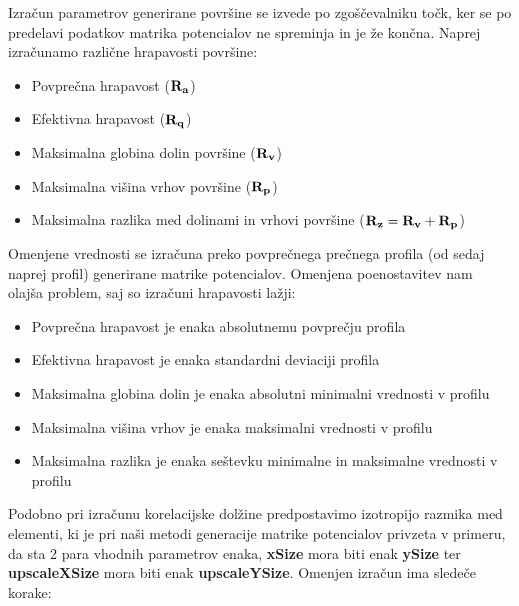 \documentclass[a4paper,twoside,openright,12pt,slovene]{book}
\begin{document}
Izračun parametrov generirane površine se izvede po zgoščevalniku točk, ker se po predelavi podatkov matrika potencialov ne spreminja in je že končna. Naprej izračunamo različne hrapavosti površine:

\begin{itemize}
    \setlength\itemsep{0.1em}
    \item Povprečna hrapavost ($\bf R_a$) 
    \item Efektivna hrapavost ($\bf R_q$) 
    \item Maksimalna globina dolin površine ($\bf R_v$) 
    \item Maksimalna višina vrhov površine ($\bf R_p$) 
    \item Maksimalna razlika med dolinami in vrhovi površine ($\bf R_z = R_v + R_p$) 
\end{itemize}

Omenjene vrednosti se izračuna preko povprečnega prečnega profila (od sedaj naprej profil) generirane matrike potencialov. \cite{matlab_sr} Omenjena poenostavitev nam olajša problem, saj so izračuni hrapavosti lažji:

\begin{itemize}
    \setlength\itemsep{0.1em}
    \item Povprečna hrapavost je enaka absolutnemu povprečju profila
    \item Efektivna hrapavost je enaka standardni deviaciji profila
    \item Maksimalna globina dolin je enaka absolutni minimalni vrednosti v profilu
    \item Maksimalna višina vrhov je enaka maksimalni vrednosti v profilu
    \item Maksimalna razlika je enaka seštevku minimalne in maksimalne vrednosti v profilu
\end{itemize}

Podobno pri izračunu korelacijske dolžine predpostavimo izotropijo razmika med elementi, ki je pri naši metodi generacije matrike potencialov privzeta v primeru, da sta 2 para vhodnih parametrov enaka, \textbf{xSize} mora biti enak \textbf{ySize} ter \textbf{upscaleXSize} mora biti enak \textbf{upscaleYSize}. Omenjen izračun ima sledeče korake:
\end{document}
